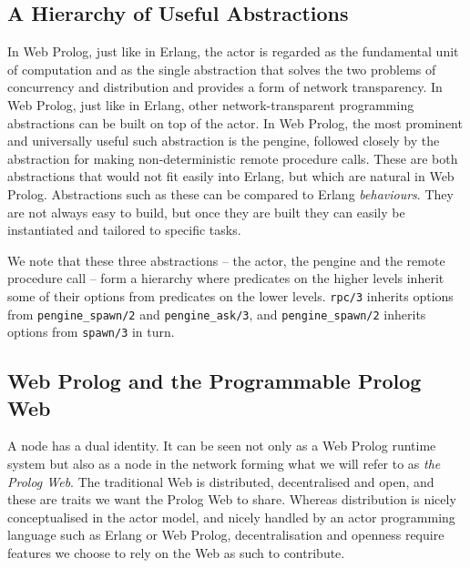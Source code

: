 \documentclass{tlp}
\begin{document}
\vspace{-1mm}
\subsection{A Hierarchy of Useful Abstractions}\label{sec:hierarchy-of-abstraction}

In Web Prolog, just like in Erlang, the actor is regarded as the fundamental unit of computation and as the single abstraction that solves the two problems of concurrency and distribution and provides a form of network transparency. In Web Prolog, just like in Erlang, other network-transparent programming abstractions can be built on top of the actor. In Web Prolog, the most prominent and universally useful such abstraction is the pengine, followed closely by the abstraction for making non-deterministic remote procedure calls. These are both abstractions that would not fit easily into Erlang, but which are natural in Web Prolog. Abstractions such as these can be compared to Erlang \textit{behaviours}. They are not always easy to build, but once they are built they can easily be instantiated and tailored to specific tasks. 

We note that these three abstractions -- the actor, the pengine and the remote procedure call -- form a hierarchy where predicates on the higher levels inherit some of their options from predicates on the lower levels. \texttt{rpc/3} inherits options from \texttt{pengine\_spawn/2} and \texttt{pengine\_ask/3}, and \texttt{pengine\_spawn/2} inherits options from \texttt{spawn/3} in turn. 



%

\vspace{-1mm}
\subsection{Web Prolog and the Programmable Prolog Web}\label{sec:for-erlangers-2}

A node has a dual identity. It can be seen not only as a Web Prolog runtime system but also as a node in the network forming what we will refer to as \textit{the Prolog Web}. The traditional Web is distributed, decentralised and open, and these are traits we want the Prolog Web to share. Whereas distribution is nicely conceptualised in the actor model, and nicely handled by an actor programming language such as Erlang or Web Prolog, decentralisation and openness require features we choose to rely on the Web as such to contribute.
\end{document}
